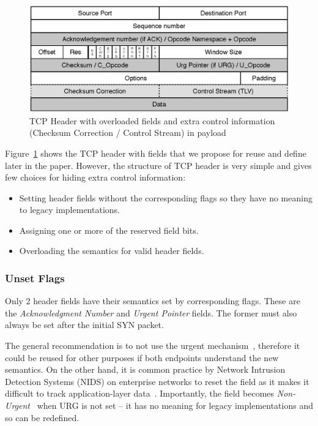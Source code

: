 \documentclass{sig-alternate-10pt}
\begin{document}
\begin{figure}[t!]
\centering
\small{
\includegraphics[width=.99\columnwidth]{figs/tcp-header}
\vspace{-5mm}
\caption{TCP Header with overloaded fields and extra control information (Checksum Correction / Control Stream) in payload}
\label{fig:header}
}
\vspace{-4mm}
\end{figure}

Figure~\ref{fig:header} shows the TCP header with fields that we propose for reuse and define later in the paper. However, the structure of TCP header is very simple and gives few choices for hiding extra control information:
\begin{itemize}
    \item Setting header fields without the corresponding flags so they have no meaning to legacy implementations.
    \item Assigning one or more of the reserved field bits.
    \item Overloading the semantics for valid header fields.
\end{itemize}

\subsubsection*{Unset Flags}
\label{sec:unset}

Only 2 header fields have their semantics set by corresponding flags. These are the \emph{Acknowledgment Number} and \emph{Urgent Pointer} fields. The former must also always be set after the initial SYN packet.

The general recommendation is to not use the urgent mechanism~\cite{Gont:2011vi}, therefore it could be reused for other purposes if both endpoints understand the new semantics. On the other hand, it is common practice by Network Intrusion Detection Systems (NIDS) on enterprise networks to reset the field as it makes it difficult to track application-layer data~\cite{seolma}. Importantly, the field becomes \emph{Non-Urgent}~\cite{Kuhlewind:2014vd} when URG is not set -- it has no meaning for legacy implementations and so can be redefined.
\end{document}
